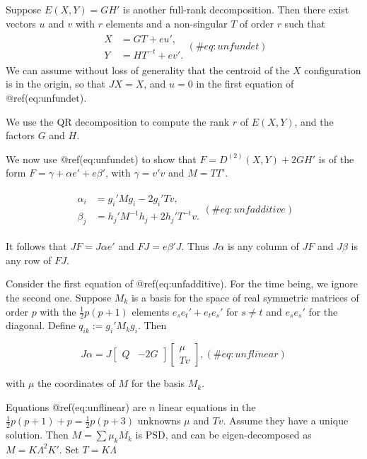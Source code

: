 \documentclass[
  12pt,
  letterpaper,
  DIV=11,
  numbers=noendperiod]{scrreprt}
\theoremstyle{remark}
\begin{document}
Suppose \(E(X,Y)=GH'\) is another full-rank decomposition. Then there
exist vectors \(u\) and \(v\) with \(r\) elements and a non-singular
\(T\) of order \(r\) such that \begin{align}
\begin{split}
X&=GT+eu',\\
Y&=HT^{-t}+ev'.
\end{split}
(\#eq:unfundet)
\end{align} We can assume without loss of generality that the centroid
of the \(X\) configuration is in the origin, so that \(JX=X\), and
\(u=0\) in the first equation of @ref(eq:unfundet).

We use the QR decomposition to compute the rank \(r\) of \(E(X,Y)\), and
the factors \(G\) and \(H\).

We now use @ref(eq:unfundet) to show that \(F=D^{(2)}(X,Y)+2GH'\) is of
the form \(F=\gamma+\alpha e'+e\beta'\), with \(\gamma=v'v\) and
\(M=TT'\).

\begin{align}
\begin{split}
\alpha_i&=g_i'Mg_i-2g_i'Tv,\\
\beta_j&=h_j'M^{-1}h_j+2h_j'T^{-t}v.
\end{split}
(\#eq:unfadditive)
\end{align}

It follows that \(JF=J\alpha e'\) and \(FJ=e\beta' J\). Thus \(J\alpha\)
is any column of \(JF\) and \(J\beta\) is any row of \(FJ\).

Consider the first equation of @ref(eq:unfadditive). For the time being,
we ignore the second one. Suppose \(M_k\) is a basis for the space of
real symmetric matrices of order \(p\) with the \(\frac12 p(p+1)\)
elements \(e_se_t'+e_te_s'\) for \(s\not= t\) and \(e_se_s'\) for the
diagonal. Define \(q_{ik}:=g_i'M_kg_i\). Then

\begin{equation}
J\alpha=J\begin{bmatrix}Q&-2G\end{bmatrix}\begin{bmatrix}\mu\\Tv\end{bmatrix},
(\#eq:unflinear)
\end{equation}

with \(\mu\) the coordinates of \(M\) for the basis \(M_k\).

Equations @ref(eq:unflinear) are \(n\) linear equations in the
\(\frac12 p(p+1)+p=\frac12 p(p+3)\) unknowns \(\mu\) and \(Tv\). Assume
they have a unique solution. Then \(M=\sum\mu_kM_k\) is PSD, and can be
eigen-decomposed as \(M=K\Lambda^2 K'\). Set \(T=K\Lambda\)
\end{document}
